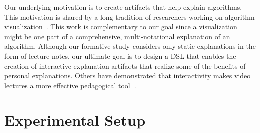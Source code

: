 \documentclass[sigconf]{acmart}
\begin{document}
Our underlying motivation is to create artifacts that help explain algorithms.
This motivation is shared by a long tradition of researchers working on
algorithm
visualization~\cite{Gloor92,Gloor97,HDS02,shaffer2010algorithm,HANSEN2002291,
Naps:2002:ERV:782941.782998,Grissom:2003:AVC:774833.774846,KANN1997223}.
%
This work is complementary to our goal since a visualization might be one part
of a comprehensive, multi-notational explanation of an algorithm.
%
%
Although our formative study considers only static explanations in the form of
lecture notes, our ultimate goal is to design a DSL that enables the creation
of interactive explanation artifacts that realize some of the benefits of
personal explanations. Others have demonstrated that interactivity makes video
lectures a more effective pedagogical
tool~\cite{Schwan2004293,Merkt2011687,zhang2005interactive}.

%


\section{Experimental Setup}
\label{sec:exp:setup}
\end{document}
